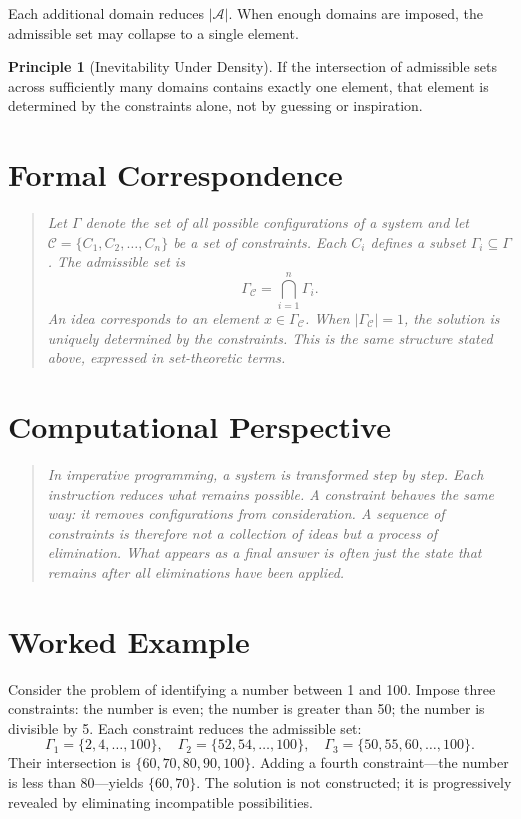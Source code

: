 \documentclass[11pt]{book}
\theoremstyle{plain}
\theoremstyle{definition}
\newtheorem{principle}[theorem]{Principle}
\theoremstyle{remark}
\newcommand{\A}{\mathcal{A}}
\newenvironment{formalcorrespondence}
  {\begin{quote}\small\itshape}
  {\end{quote}}
\newenvironment{computationalaside}
  {\begin{quote}\small\itshape}
  {\end{quote}}
\begin{document}
Each additional domain reduces $|\A|$. When enough domains are imposed,
the admissible set may collapse to a single element.

\begin{principle}[Inevitability Under Density]
If the intersection of admissible sets across sufficiently many domains
contains exactly one element, that element is determined by the constraints
alone, not by guessing or inspiration.
\end{principle}

\section*{Formal Correspondence}
\begin{formalcorrespondence}
Let $\Gamma$ denote the set of all possible configurations of a system and
let $\mathcal{C} = \{C_1, C_2, \dots, C_n\}$ be a set of constraints. Each
$C_i$ defines a subset $\Gamma_i \subseteq \Gamma$. The admissible set is
\[
  \Gamma_{\mathcal{C}} = \bigcap_{i=1}^n \Gamma_i.
\]
An idea corresponds to an element $x \in \Gamma_{\mathcal{C}}$. When
$|\Gamma_{\mathcal{C}}| = 1$, the solution is uniquely determined by the
constraints. This is the same structure stated above, expressed in
set-theoretic terms.
\end{formalcorrespondence}

\section*{Computational Perspective}
\begin{computationalaside}
In imperative programming, a system is transformed step by step. Each
instruction reduces what remains possible. A constraint behaves the same
way: it removes configurations from consideration. A sequence of
constraints is therefore not a collection of ideas but a process of
elimination. What appears as a final answer is often just the state that
remains after all eliminations have been applied.
\end{computationalaside}

\section*{Worked Example}
Consider the problem of identifying a number between 1 and 100. Impose
three constraints: the number is even; the number is greater than 50; the
number is divisible by 5. Each constraint reduces the admissible set:
\[
  \Gamma_1 = \{2,4,\dots,100\}, \quad
  \Gamma_2 = \{52,54,\dots,100\}, \quad
  \Gamma_3 = \{50,55,60,\dots,100\}.
\]
Their intersection is $\{60,70,80,90,100\}$. Adding a fourth
constraint---the number is less than 80---yields $\{60,70\}$. The solution
is not constructed; it is progressively revealed by eliminating
incompatible possibilities.
\end{document}
